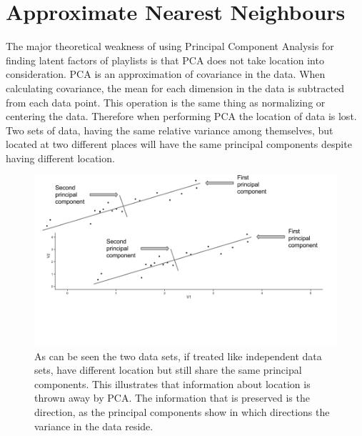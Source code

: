 \documentclass[a4paper,11pt]{kth-mag}
\begin{document}
\section{Approximate Nearest Neighbours}
The major theoretical weakness of using Principal Component Analysis for finding latent factors of playlists is that PCA does not take location into consideration. PCA is an approximation of covariance in the data. When calculating covariance, the mean for each dimension in the data is subtracted from each data point. This operation is the same thing as normalizing or centering the data. Therefore when performing PCA the location of data is lost. Two sets of data, having the same relative variance among themselves, but located at two different places will have the same principal components despite having different location.

\begin{figure}
\includegraphics[scale=0.42]{images/pcaNormalize.png}
\caption{As can be seen the two data sets, if treated like independent data sets, have different location but still share the same principal components. This illustrates that information about location is thrown away by PCA. The information that is preserved is the direction, as the principal components show in which directions the variance in the data reside.}
\end{figure}
\end{document}

